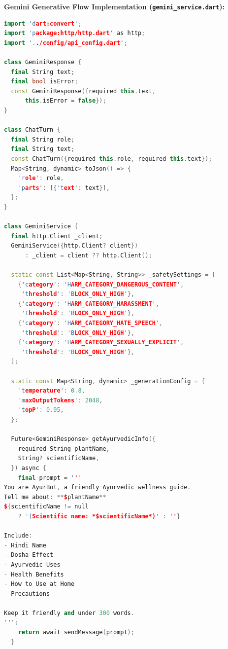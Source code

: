 \documentclass[12pt]{article}
\begin{document}
\textbf{Gemini Generative Flow Implementation (\texttt{gemini\_service.dart}):}
\begin{lstlisting}[language=C++]
import 'dart:convert';
import 'package:http/http.dart' as http;
import '../config/api_config.dart';

class GeminiResponse {
  final String text;
  final bool isError;
  const GeminiResponse({required this.text,
      this.isError = false});
}

class ChatTurn {
  final String role;
  final String text;
  const ChatTurn({required this.role, required this.text});
  Map<String, dynamic> toJson() => {
    'role': role,
    'parts': [{'text': text}],
  };
}

class GeminiService {
  final http.Client _client;
  GeminiService({http.Client? client})
      : _client = client ?? http.Client();

  static const List<Map<String, String>> _safetySettings = [
    {'category': 'HARM_CATEGORY_DANGEROUS_CONTENT',
     'threshold': 'BLOCK_ONLY_HIGH'},
    {'category': 'HARM_CATEGORY_HARASSMENT',
     'threshold': 'BLOCK_ONLY_HIGH'},
    {'category': 'HARM_CATEGORY_HATE_SPEECH',
     'threshold': 'BLOCK_ONLY_HIGH'},
    {'category': 'HARM_CATEGORY_SEXUALLY_EXPLICIT',
     'threshold': 'BLOCK_ONLY_HIGH'},
  ];

  static const Map<String, dynamic> _generationConfig = {
    'temperature': 0.8,
    'maxOutputTokens': 2048,
    'topP': 0.95,
  };

  Future<GeminiResponse> getAyurvedicInfo({
    required String plantName,
    String? scientificName,
  }) async {
    final prompt = '''
You are AyurBot, a friendly Ayurvedic wellness guide.
Tell me about: **$plantName**
${scientificName != null
    ? '(Scientific name: *$scientificName*)' : ''}

Include:
- Hindi Name
- Dosha Effect
- Ayurvedic Uses
- Health Benefits
- How to Use at Home
- Precautions

Keep it friendly and under 300 words.
''';
    return await sendMessage(prompt);
  }


\end{lstlisting}
\end{document}
